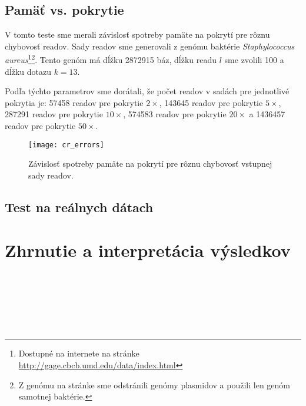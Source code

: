 \subsection{Pamäť vs. pokrytie}
V tomto teste sme merali závislosť spotreby pamäte na pokrytí pre rôznu chybovosť readov. Sady readov sme generovali z genómu baktérie \emph{Staphylococcus aureus}\footnote{Dostupné na internete na stránke \url{http://gage.cbcb.umd.edu/data/index.html}}\footnote{Z genómu na stránke sme odstránili genómy plasmidov a použili len genóm samotnej baktérie.}. Tento genóm má dĺžku 2872915 báz, dĺžku readu $l$ sme zvolili 100 a dĺžku dotazu $k=13$. 

Podľa týchto parametrov sme dorátali, že počet readov v sadách pre jednotlivé pokrytia je: 57458 readov pre pokrytie $2\times$, 143645 readov pre pokrytie $5\times$, 287291 readov pre pokrytie $10\times$, 574583 readov pre pokrytie $20\times$ a 1436457 readov pre pokrytie $50\times$.

\begin{figure}[h]
    \centering
    \texttt{[image: cr\_errors]}
    \caption{Závislosť spotreby pamäte na pokrytí pre rôznu chybovosť vstupnej sady readov.}
    \label{fig:graf_staphyl}
\end{figure}

\subsection{Test na reálnych dátach}

\section{Zhrnutie a interpretácia výsledkov}

\\
 \\
 \\
 \\
 \\

